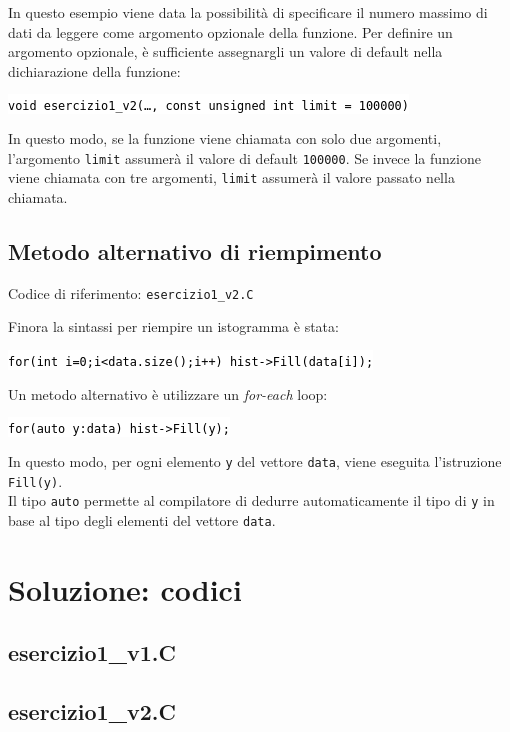 \documentclass[10pt]{article}
\newcommand{\ttt}{\texttt}
\newcommand{\tcpp}[1]{\hspace{10pt}\colorbox{background}{\textcolor{black}{\texttt{#1}}}}
\begin{document}
In questo esempio viene data la possibilità di specificare il numero massimo di dati da leggere come argomento opzionale della funzione.
Per definire un argomento opzionale, è sufficiente assegnargli un valore di default nella dichiarazione della funzione:

    \tcpp{void esercizio1\_v2(\ldots, const unsigned int limit = 100000)}

In questo modo, se la funzione viene chiamata con solo due argomenti, l'argomento \ttt{limit} assumerà il valore di default \ttt{100000}.
Se invece la funzione viene chiamata con tre argomenti, \ttt{limit} assumerà il valore passato nella chiamata.

\subsection{Metodo alternativo di riempimento}
Codice di riferimento: \ttt{esercizio1\_v2.C} \vspace{10pt}

Finora la sintassi per riempire un istogramma è stata:

    \tcpp{for(int i=0;i<data.size();i++) hist->Fill(data[i]);}

Un metodo alternativo è utilizzare un \textit{for-each} loop:

    \tcpp{for(auto y:data) hist->Fill(y);}

In questo modo, per ogni elemento \ttt{y} del vettore \ttt{data}, viene eseguita l'istruzione \ttt{Fill(y)}.\\
Il tipo \ttt{auto} permette al compilatore di dedurre automaticamente il tipo di \ttt{y} in base al tipo degli elementi del vettore \ttt{data}.


\newpage
\section{Soluzione: codici}

\subsection{esercizio1\_v1.C}


\newpage

\subsection{esercizio1\_v2.C}

\end{document}
